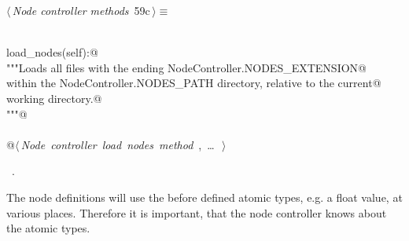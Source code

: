 \documentclass[
    a4paper,      %
    10pt,         %
    openright,    %
    notitlepage,  %
    parskip=half, %
]{scrreprt}       %
\theoremstyle{definition}                    %
\begin{document}
\begin{flushleft} \small
\begin{minipage}{\linewidth}\label{scrap99}\raggedright\small
{} $\langle\,${\itshape Node controller methods}\nobreak\ {\footnotesize {59c}}$\,\rangle\equiv$
\vspace{-1ex}
\begin{list}{}{} \item
\mbox{}\lstinline@@\\
\mbox{}\lstinline@def load_nodes(self):@\\
\mbox{}\lstinline@    """Loads all files with the ending NodeController.NODES_EXTENSION@\\
\mbox{}\lstinline@    within the NodeController.NODES_PATH directory, relative to the current@\\
\mbox{}\lstinline@    working directory.@\\
\mbox{}\lstinline@    """@\\
\mbox{}\lstinline@@\\
\mbox{}\lstinline@    @\hbox{$\langle\,${\itshape Node controller load nodes method}\nobreak\ {\footnotesize {}, \ldots\ }$\,\rangle$}\lstinline@@{\NWsep}
\end{list}
\vspace{-1.5ex}
\footnotesize
\begin{list}{}{\setlength{\itemsep}{-\parsep}\setlength{\itemindent}{-\leftmargin}}
\item \NWtxtMacroRefIn\ .

\item{}
\end{list}
\end{minipage}\vspace{4ex}
\end{flushleft}
The node definitions will use the before defined atomic types, e.g. a float
value, at various places. Therefore it is important, that the node controller
knows about the atomic types.
\end{document}
